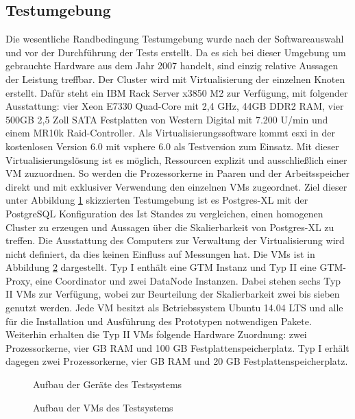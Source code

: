 \subsection{Testumgebung}
Die wesentliche Randbedingung Testumgebung wurde nach der Softwareauswahl und vor der Durchführung der Tests erstellt.
Da es sich bei dieser Umgebung um gebrauchte Hardware aus dem Jahr 2007 handelt, sind einzig relative Aussagen der Leistung treffbar.
Der Cluster wird mit Virtualisierung der einzelnen Knoten erstellt.
Dafür steht ein IBM Rack Server x3850 M2 zur Verfügung, mit folgender Ausstattung:
vier Xeon E7330 Quad-Core mit 2,4 GHz, 44GB DDR2 RAM, vier 500GB 2,5 Zoll SATA Festplatten von Western Digital mit 7.200 U/min und einem MR10k Raid-Controller.
Als Virtualisierungssoftware kommt \Gls{esxi} in der kostenlosen Version 6.0 mit \Gls{vsphere} 6.0 als Testversion zum Einsatz.
Mit dieser Virtualisierungslösung ist es möglich, Ressourcen explizit und ausschließlich einer VM zuzuordnen.
So werden die Prozessorkerne in Paaren und der Arbeitsspeicher direkt und mit exklusiver Verwendung den einzelnen VMs zugeordnet.
Ziel dieser unter Abbildung \ref{fig:physAufb} skizzierten Testumgebung ist es Postgres-XL mit der PostgreSQL Konfiguration des Ist Standes zu vergleichen, einen homogenen Cluster zu erzeugen und Aussagen über die Skalierbarkeit von Postgres-XL zu treffen.
Die Ausstattung des Computers zur Verwaltung der Virtualisierung wird nicht definiert, da dies keinen Einfluss auf Messungen hat.
Die VMs ist in Abbildung \ref{fig:VMAufb} dargestellt.
Typ I enthält eine GTM Instanz und Typ II eine GTM-Proxy, eine Coordinator und zwei DataNode Instanzen.
Dabei stehen sechs Typ II VMs zur Verfügung, wobei zur Beurteilung der Skalierbarkeit zwei bis sieben genutzt werden.
Jede VM besitzt als Betriebssystem Ubuntu 14.04 LTS und alle für die Installation und Ausführung des Prototypen notwendigen Pakete.
Weiterhin erhalten die Typ II VMs folgende Hardware Zuordnung:
zwei Prozessorkerne, vier GB RAM und 100 GB Festplattenspeicherplatz.
Typ I erhält dagegen zwei Prozessorkerne, vier GB RAM und 20 GB Festplattenspeicherplatz.
\begin{figure}[h!]
\centering

\caption[Aufbau der Geräte des Testsystems]{Aufbau der Geräte des Testsystems}
\label{fig:physAufb}
\end{figure}
\begin{figure}[h!]
\centering

\caption[Aufbau der VMs des Testsystems]{Aufbau der VMs des Testsystems}
\label{fig:VMAufb}
\end{figure}

